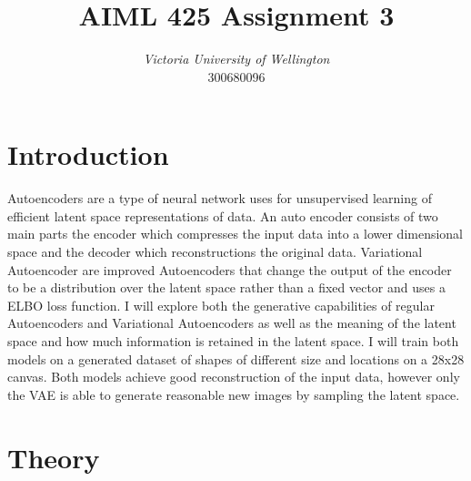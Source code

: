 \documentclass[conference,a4paper]{IEEEtran}
\begin{document}
\title{AIML 425 Assignment 3 %
}

\author{
\textit{Victoria University of Wellington}\\
300680096}


\maketitle

\section{Introduction}

Autoencoders are a type of neural network uses for unsupervised learning of efficient latent space representations of data. An auto encoder consists of two main parts the encoder which compresses the input data into a lower dimensional space and the decoder which reconstructions the original data. Variational Autoencoder are improved Autoencoders that change the output of the encoder to be a distribution over the latent space rather than a fixed vector and uses a ELBO loss function. I will explore both the generative capabilities of regular Autoencoders and Variational Autoencoders as well as the meaning of the latent space and how much information is retained in the latent space. I will train both models on a generated dataset of shapes of different size and locations on a 28x28 canvas. Both models achieve good reconstruction of the input data, however only the VAE is able to generate reasonable new images by sampling the latent space.

\section{Theory}
\end{document}
